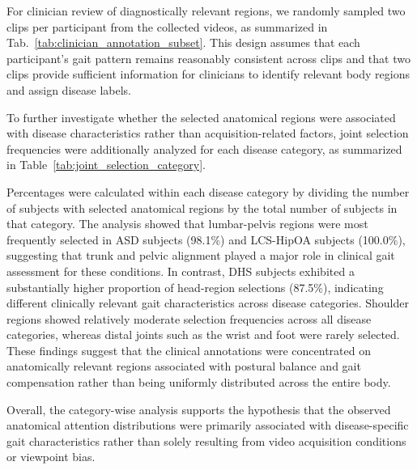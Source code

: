 \documentclass[review,authoryear,times]{elsarticle}
\begin{document}
For clinician review of diagnostically relevant regions, we randomly sampled two clips per participant from the collected videos, as summarized in Tab.~\ref{tab:clinician_annotation_subset}. 
This design assumes that each participant’s gait pattern remains reasonably consistent across clips and that two clips provide sufficient information for clinicians to identify relevant body regions and assign disease labels.

\begin{table}[t]
\centering
\caption{Frequency of clinically selected anatomical regions across different disease categories. Values are presented as the number of selected cases with percentages in parentheses.}
\label{tab:joint_selection_category}
\renewcommand{\arraystretch}{1.15}
\setlength{\tabcolsep}{8pt}
\end{table}

{
\color{blue}
To further investigate whether the selected anatomical regions were associated with disease characteristics rather than acquisition-related factors, joint selection frequencies were additionally analyzed for each disease category, as summarized in Table~\ref{tab:joint_selection_category}.

Percentages were calculated within each disease category by dividing the number of subjects with selected anatomical regions by the total number of subjects in that category.
The analysis showed that lumbar-pelvis regions were most frequently selected in ASD subjects (98.1\%) and LCS-HipOA subjects (100.0\%), suggesting that trunk and pelvic alignment played a major role in clinical gait assessment for these conditions. In contrast, DHS subjects exhibited a substantially higher proportion of head-region selections (87.5\%), indicating different clinically relevant gait characteristics across disease categories.
Shoulder regions showed relatively moderate selection frequencies across all disease categories, whereas distal joints such as the wrist and foot were rarely selected. These findings suggest that the clinical annotations were concentrated on anatomically relevant regions associated with postural balance and gait compensation rather than being uniformly distributed across the entire body.

Overall, the category-wise analysis supports the hypothesis that the observed anatomical attention distributions were primarily associated with disease-specific gait characteristics rather than solely resulting from video acquisition conditions or viewpoint bias.
}
\end{document}
